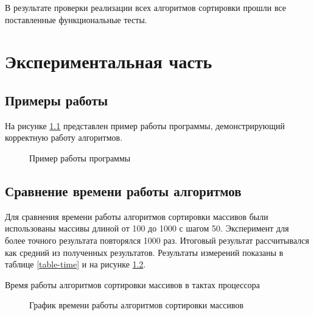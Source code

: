 \documentclass[12pt, a4paper]{report}
\begin{document}
	В результате проверки реализации всех алгоритмов сортировки прошли все поставленные функциональные тесты.

	\chapter{Экспериментальная часть}
	\section{Примеры работы}
	На рисунке \ref{pic:example} представлен пример работы программы, демонстрирующий корректную работу алгоритмов.
	\begin{figure}[ht!]
		\centering
		\caption{Пример работы программы}
		\label{pic:example}
	\end{figure}
	
	\section{Сравнение времени работы алгоритмов}
	Для сравнения времени работы алгоритмов сортировки массивов были использованы массивы длиной от 100 до 1000 с шагом 50. Эксперимент для более точного результата повторялся 1000 раз. Итоговый результат рассчитывался как средний из полученных результатов. Результаты измерений показаны в таблице \ref{table-time} и на рисунке \ref{graph-time}.\\
	\begin{table}[ht!]
		\caption{Время работы алгоритмов сортировки массивов в тактах процессора}
		\label{table-time}
		\begin{center}
		\end{center}
	\end{table}
	
	\begin{figure}[ht!]
		\caption{График времени работы алгоритмов сортировки массивов}
		\label{graph-time}
	\end{figure}
\end{document}
